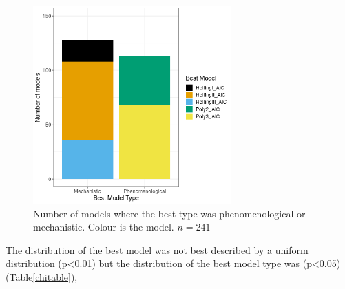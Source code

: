 \documentclass{article}
\begin{document}
\begin{figure}[h!] %
    \centering
    \includegraphics[width=3in]{../Results/Plots/modelbesttype.png}
    \caption{Number of models where the best type was phenomenological or mechanistic. Colour is the model. $n=241$}
    \label{fig:modelbesttype}
\end{figure}
The distribution of the best model was not best described by a uniform distribution (p<0.01) but the distribution of the best model type was (p<0.05) (Table\ref{chitable}),

\end{document}
